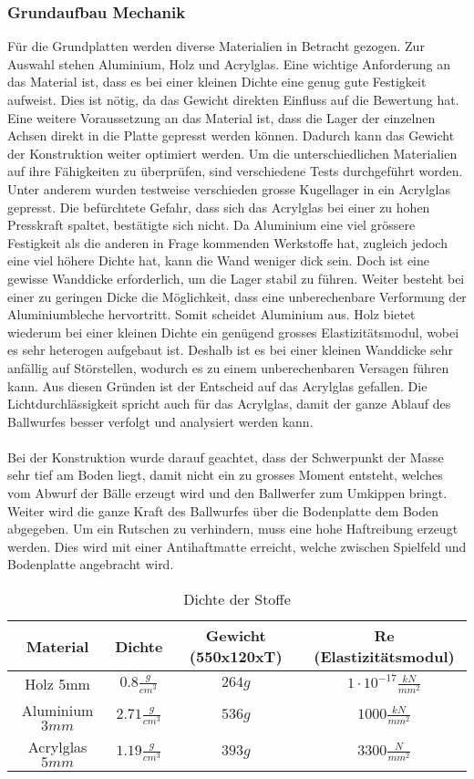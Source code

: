 \subsubsection{Grundaufbau Mechanik}
Für die Grundplatten werden diverse Materialien in Betracht gezogen. Zur Auswahl stehen Aluminium,
Holz und Acrylglas. Eine wichtige Anforderung an das Material ist, dass es bei einer kleinen Dichte
eine genug gute Festigkeit aufweist. Dies ist nötig, da das Gewicht direkten Einfluss auf die
Bewertung hat. Eine weitere Voraussetzung an das Material ist, dass die Lager der einzelnen Achsen
direkt in die Platte gepresst werden können. Dadurch kann das Gewicht der Konstruktion weiter
optimiert werden. Um die unterschiedlichen Materialien auf ihre Fähigkeiten zu überprüfen, sind
verschiedene Tests durchgeführt worden. Unter anderem wurden testweise verschieden grosse Kugellager
in ein Acrylglas gepresst. Die befürchtete Gefahr, dass sich das Acrylglas bei einer zu hohen
Presskraft spaltet, bestätigte sich nicht. Da Aluminium eine viel grössere Festigkeit als die
anderen in Frage kommenden Werkstoffe hat, zugleich jedoch eine viel höhere Dichte hat, kann die
Wand weniger dick sein. Doch ist eine gewisse Wanddicke erforderlich, um die Lager stabil zu führen.
Weiter besteht bei einer zu geringen Dicke die Möglichkeit, dass eine unberechenbare Verformung der
Aluminiumbleche hervortritt. Somit scheidet Aluminium aus. Holz bietet wiederum bei einer kleinen
Dichte ein genügend grosses Elastizitätsmodul, wobei es sehr heterogen aufgebaut ist. Deshalb ist es
bei einer kleinen Wanddicke sehr anfällig auf Störstellen, wodurch es zu einem unberechenbaren
Versagen führen kann. Aus diesen Gründen ist der Entscheid auf das Acrylglas gefallen. Die
Lichtdurchlässigkeit spricht auch für das Acrylglas, damit der ganze Ablauf des Ballwurfes besser
verfolgt und analysiert werden kann.\\
\\
Bei der Konstruktion wurde darauf geachtet, dass der Schwerpunkt der Masse sehr tief am Boden liegt,
damit nicht ein zu grosses Moment entsteht, welches vom Abwurf der Bälle erzeugt wird und den
Ballwerfer zum Umkippen bringt. Weiter wird die ganze Kraft des Ballwurfes über die Bodenplatte dem
Boden abgegeben. Um ein Rutschen zu verhindern, muss eine hohe Haftreibung erzeugt werden. Dies wird
mit einer Antihaftmatte erreicht, welche zwischen Spielfeld und Bodenplatte angebracht wird.
\begin{table}[h!]
	\begin{tabular}{cccc}
		Material & Dichte & Gewicht (550x120xT) & Re (Elastizitätsmodul) \\ 
		\hline \rule{0pt}{11pt}Holz 5mm & $0.8 \frac{g}{cm^3}$ & $264 g$ & $1 \cdot 10^{-17} \frac{kN}{mm^2}$ \\ 
		\rule{0pt}{11pt}Aluminium $3 mm$ & $2.71 \frac{g}{cm^3}$ & $536 g$ & $1000 \frac{kN}{mm^2}$ \\ 
		\rule{0pt}{11pt}Acrylglas $5 mm$ & $1.19 \frac{g}{cm^3}$ & $393 g$ & $3300 \frac{N}{mm^2}$  \\ 
	\end{tabular} 
	\caption[Dichte der Stoffe]{Dichte der Stoffe \cite{beruf:Chemie}}
	\centering
\end{table}